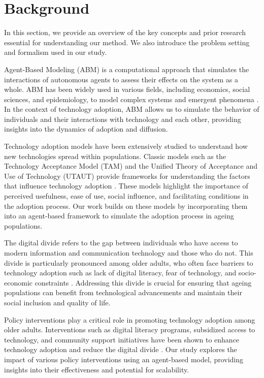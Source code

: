 \documentclass{article} %
\begin{document}
\section{Background}
\label{sec:background}

In this section, we provide an overview of the key concepts and prior research essential for understanding our method. We also introduce the problem setting and formalism used in our study.

Agent-Based Modeling (ABM) is a computational approach that simulates the interactions of autonomous agents to assess their effects on the system as a whole. ABM has been widely used in various fields, including economics, social sciences, and epidemiology, to model complex systems and emergent phenomena \citep{poledna2023economic, west2023agent}. In the context of technology adoption, ABM allows us to simulate the behavior of individuals and their interactions with technology and each other, providing insights into the dynamics of adoption and diffusion.

Technology adoption models have been extensively studied to understand how new technologies spread within populations. Classic models such as the Technology Acceptance Model (TAM) and the Unified Theory of Acceptance and Use of Technology (UTAUT) provide frameworks for understanding the factors that influence technology adoption \citep{zhou2023peer, Venkatesh2021UnifiedTO}. These models highlight the importance of perceived usefulness, ease of use, social influence, and facilitating conditions in the adoption process. Our work builds on these models by incorporating them into an agent-based framework to simulate the adoption process in ageing populations.

The digital divide refers to the gap between individuals who have access to modern information and communication technology and those who do not. This divide is particularly pronounced among older adults, who often face barriers to technology adoption such as lack of digital literacy, fear of technology, and socio-economic constraints \citep{park2023generative}. Addressing this divide is crucial for ensuring that ageing populations can benefit from technological advancements and maintain their social inclusion and quality of life.

Policy interventions play a critical role in promoting technology adoption among older adults. Interventions such as digital literacy programs, subsidized access to technology, and community support initiatives have been shown to enhance technology adoption and reduce the digital divide \citep{shanahan2023role}. Our study explores the impact of various policy interventions using an agent-based model, providing insights into their effectiveness and potential for scalability.
\end{document}
